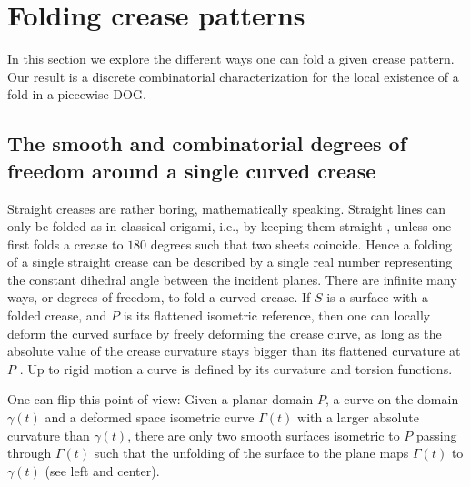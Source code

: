 
\section{Folding crease patterns} \label{sec:folding}
In this section we explore the different ways one can fold a given crease pattern. Our result is a discrete combinatorial characterization for the local existence of a fold in a piecewise DOG.

\subsection{The smooth and combinatorial degrees of freedom around a single curved crease}
\label{sec:smooth-combinatorial}

Straight creases are rather boring, mathematically speaking. Straight lines can only be folded as in classical origami, i.e., by keeping them straight \cite{demaine_lens}, unless one first folds a crease to $180$ degrees such that two sheets coincide. Hence a folding of a single straight crease can be described by a single real number representing the constant dihedral angle between the incident planes. There are infinite many ways, or degrees of freedom, to fold a curved crease. If $S$ is a surface with a folded crease, and $P$ is its flattened isometric reference, then one can locally deform the curved surface by freely deforming the crease curve, as long as the absolute value of the crease curvature stays bigger than its flattened curvature at $P$ \cite{more_on_paper}. Up to rigid motion a curve is defined by its curvature and torsion functions.

One can flip this point of view: Given a planar domain $P$, a curve on the domain $\gamma(t)$ and a deformed space isometric curve $\Gamma(t)$ with a larger absolute curvature than $\gamma(t)$, there are only two smooth surfaces isometric to $P$ passing through $\Gamma(t)$ such that the unfolding of the surface to the plane maps $\Gamma(t)$ to $\gamma(t)$ \cite{mathematical_omnibus} (see  left and center).


